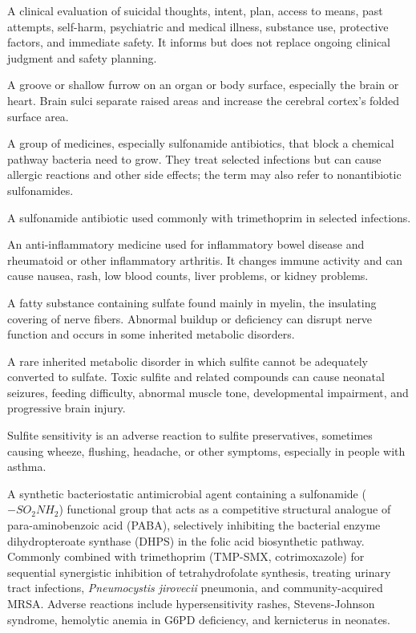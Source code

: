  A clinical evaluation of suicidal thoughts, intent, plan, access to means, past
attempts, self-harm, psychiatric and medical illness, substance use, protective factors,
and immediate safety. It informs but does not replace ongoing clinical judgment and
safety planning.

 A groove or shallow furrow on an organ or body surface, especially the brain or heart. Brain sulci separate raised areas and increase the cerebral cortex's folded surface area.

 A group of medicines, especially sulfonamide antibiotics, that block a chemical pathway bacteria need to grow. They treat selected infections but can cause allergic reactions and other side effects; the term may also refer to nonantibiotic sulfonamides.

 A sulfonamide antibiotic used commonly with trimethoprim in selected infections.

 An anti-inflammatory medicine used for inflammatory bowel disease and rheumatoid or other inflammatory arthritis. It changes immune activity and can cause nausea, rash, low blood counts, liver problems, or kidney problems.

 A fatty substance containing sulfate found mainly in myelin, the insulating covering of nerve fibers. Abnormal buildup or deficiency can disrupt nerve function and occurs in some inherited metabolic disorders.

 A rare inherited metabolic disorder in which sulfite cannot be adequately converted to sulfate. Toxic sulfite and related compounds can cause neonatal seizures, feeding difficulty, abnormal muscle tone, developmental impairment, and progressive brain injury.

 Sulfite sensitivity is an adverse reaction to sulfite preservatives, sometimes causing wheeze, flushing, headache, or other symptoms, especially in people with asthma.

 A synthetic bacteriostatic antimicrobial agent containing a sulfonamide ($-SO_2NH_2$) functional group that acts as a competitive structural analogue of para-aminobenzoic acid (PABA), selectively inhibiting the bacterial enzyme dihydropteroate synthase (DHPS) in the folic acid biosynthetic pathway. Commonly combined with trimethoprim (TMP-SMX, cotrimoxazole) for sequential synergistic inhibition of tetrahydrofolate synthesis, treating urinary tract infections, \textit{Pneumocystis jirovecii} pneumonia, and community-acquired MRSA. Adverse reactions include hypersensitivity rashes, Stevens-Johnson syndrome, hemolytic anemia in G6PD deficiency, and kernicterus in neonates.


